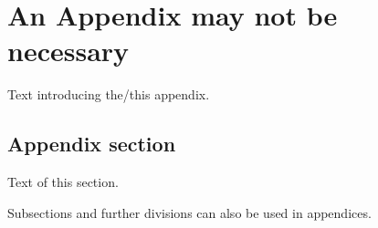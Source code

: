 \documentclass[a4paper, 12pt, notitlepage]{report}
\begin{document}
\appendix
\chapter{An Appendix may not be necessary}
%
Text introducing the/this appendix.

\section{Appendix section}
%
Text of this section.

Subsections and further divisions can also be used in appendices.

%

%
\end{document}
